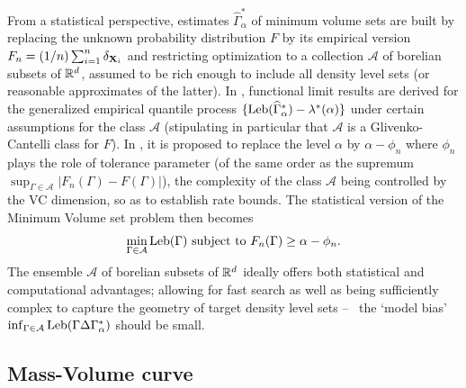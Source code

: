  From a statistical perspective, estimates $\widehat{\Gamma}^*_{\alpha}$ of minimum volume sets are built by replacing the unknown probability distribution $F$ by its empirical version $F_n=(1/n)\sum_{i=1}^n\delta_{\mathbf X_i}$ and restricting optimization to a collection $\mathcal{A}$ of borelian subsets of $\mathbb{R}^d$, assumed to be rich enough to include all density level sets (or reasonable approximates of the latter). In \cite{Polonik97}, functional limit results are derived for the generalized empirical quantile process $\{\text{Leb}(\widehat{\Gamma}^*_{\alpha})-\lambda^*(\alpha)\}$ under certain assumptions for the class $\mathcal{A}$ (stipulating in particular that $\mathcal{A}$ is a Glivenko-Cantelli class for $F$). In \cite{Scott2006}, it is proposed to replace the level $\alpha$ by $\alpha-\phi_n$ where $\phi_n$ plays the role of tolerance parameter (of the same order as the supremum $\sup_{\Gamma\in \mathcal{A}}\vert F_n(\Gamma)-F(\Gamma) \vert$), the complexity of the class $\mathcal{A}$ being controlled by the {\sc VC} dimension, so as to establish rate bounds. The statistical version of the Minimum Volume set problem then becomes
$$
\min_{\Gamma \in \mathcal{A}} \text{Leb}(\Gamma) \mbox{ subject to } F_n (\Gamma) \ge \alpha - \phi_n.
$$
The ensemble $\mathcal{A}$ of borelian subsets of $\mathbb{R}^d$ ideally offers both statistical and computational advantages; allowing for fast search as well as being sufficiently complex to capture the geometry of target density level sets -- \ie~the `model bias' $\inf_{\Gamma \in \mathcal{A}} \text{Leb}(\Gamma \Delta \Gamma^*_\alpha )$ should be small.


\subsection{Mass-Volume curve}
\label{resume:mv-curve}

